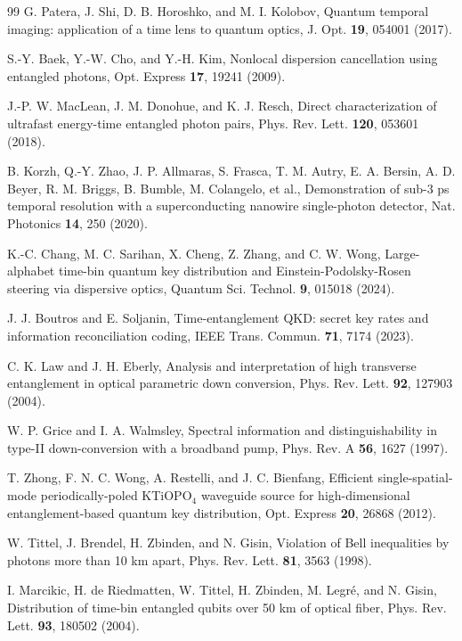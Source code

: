 \documentclass[11pt]{article}
\begin{document}
\begin{thebibliography}{99}
 G. Patera, J. Shi, D. B. Horoshko, and M. I. Kolobov, Quantum temporal imaging: application of a time lens to quantum optics, J. Opt. \textbf{19}, 054001 (2017).

 S.-Y. Baek, Y.-W. Cho, and Y.-H. Kim, Nonlocal dispersion cancellation using entangled photons, Opt. Express \textbf{17}, 19241 (2009).

 J.-P. W. MacLean, J. M. Donohue, and K. J. Resch, Direct characterization of ultrafast energy-time entangled photon pairs, Phys. Rev. Lett. \textbf{120}, 053601 (2018).

 B. Korzh, Q.-Y. Zhao, J. P. Allmaras, S. Frasca, T. M. Autry, E. A. Bersin, A. D. Beyer, R. M. Briggs, B. Bumble, M. Colangelo, et al., Demonstration of sub-3 ps temporal resolution with a superconducting nanowire single-photon detector, Nat. Photonics \textbf{14}, 250 (2020).

 K.-C. Chang, M. C. Sarihan, X. Cheng, Z. Zhang, and C. W. Wong, Large-alphabet time-bin quantum key distribution and Einstein-Podolsky-Rosen steering via dispersive optics, Quantum Sci. Technol. \textbf{9}, 015018 (2024).

 J. J. Boutros and E. Soljanin, Time-entanglement QKD: secret key rates and information reconciliation coding, IEEE Trans. Commun. \textbf{71}, 7174 (2023).

 C. K. Law and J. H. Eberly, Analysis and interpretation of high transverse entanglement in optical parametric down conversion, Phys. Rev. Lett. \textbf{92}, 127903 (2004).

 W. P. Grice and I. A. Walmsley, Spectral information and distinguishability in type-II down-conversion with a broadband pump, Phys. Rev. A \textbf{56}, 1627 (1997).

 T. Zhong, F. N. C. Wong, A. Restelli, and J. C. Bienfang, Efficient single-spatial-mode periodically-poled KTiOPO$_4$ waveguide source for high-dimensional entanglement-based quantum key distribution, Opt. Express \textbf{20}, 26868 (2012).

 W. Tittel, J. Brendel, H. Zbinden, and N. Gisin, Violation of Bell inequalities by photons more than 10 km apart, Phys. Rev. Lett. \textbf{81}, 3563 (1998).

 I. Marcikic, H. de Riedmatten, W. Tittel, H. Zbinden, M. Legr\'e, and N. Gisin, Distribution of time-bin entangled qubits over 50 km of optical fiber, Phys. Rev. Lett. \textbf{93}, 180502 (2004).


\end{thebibliography}
\end{document}
